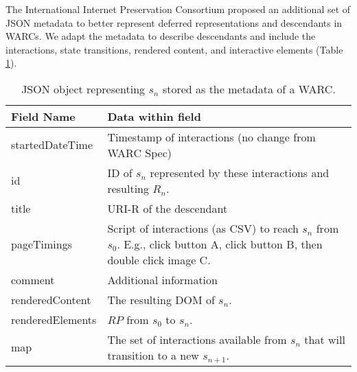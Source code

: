 \documentclass{sig-alternate}
\begin{document}
The International Internet Preservation Consortium proposed \cite{warcrevision, warcTargets}  an additional set of JSON metadata to better
represent deferred representations and descendants in
WARCs. We adapt the metadata to describe descendants
and include the interactions, state transitions, rendered content,
and interactive elements (Table \ref{fields}).


\begin{table}
\centering
\begin{tabular}{l | p{5cm}}
\textbf{Field Name} & \textbf{Data within field} \\
\hline
\hline
startedDateTime & Timestamp of interactions (no change from WARC Spec)\\
\hline
id & ID of $s_n$ represented by these interactions and resulting $R_n$.\\
\hline
title & URI-R of the descendant\\
\hline
pageTimings & Script of interactions (as CSV) to reach $s_n$ from $s_0$. E.g., click button A, click button B, then double click image C.\\
\hline
comment & Additional information \\
\hline
renderedContent & The resulting DOM of $s_n$.\\
\hline
renderedElements & $RP$ from $s_0$ to $s_n$.\\
\hline
map & The set of interactions available from $s_n$ that will transition to a new $s_{n+1}$.\\
\hline
\end{tabular}
  \caption{JSON object representing $s_n$ stored as the metadata of a WARC.}
  \label{fields}
\end{table}

\end{document}
